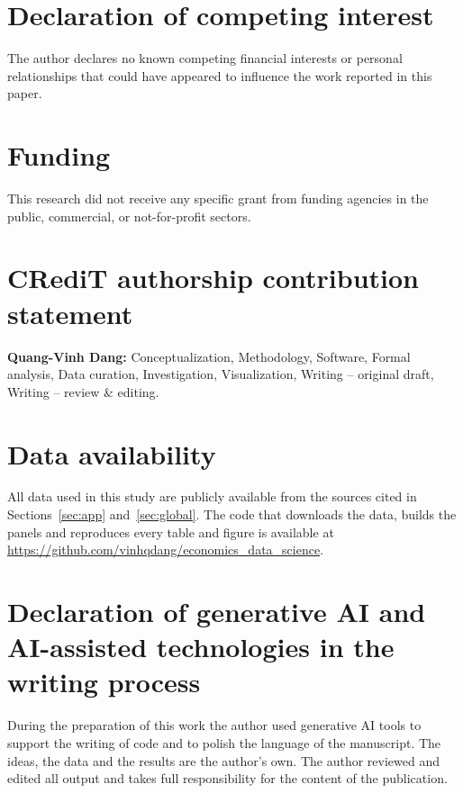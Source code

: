 \section*{Declaration of competing interest}
The author declares no known competing financial interests or personal relationships that could have appeared to influence the work reported in this paper.

\section*{Funding}
This research did not receive any specific grant from funding agencies in the public, commercial, or not-for-profit sectors.

\section*{CRediT authorship contribution statement}
\textbf{Quang-Vinh Dang:} Conceptualization, Methodology, Software, Formal analysis, Data curation, Investigation, Visualization, Writing -- original draft, Writing -- review \& editing.

\section*{Data availability}
All data used in this study are publicly available from the sources cited in Sections~\ref{sec:app} and~\ref{sec:global}. The code that downloads the data, builds the panels and reproduces every table and figure is available at \url{https://github.com/vinhqdang/economics_data_science}.


\section*{Declaration of generative AI and AI-assisted technologies in the writing process}
During the preparation of this work the author used generative AI tools to support the writing of code and to polish the language of the manuscript. The ideas, the data and the results are the author's own. The author reviewed and edited all output and takes full responsibility for the content of the publication.
